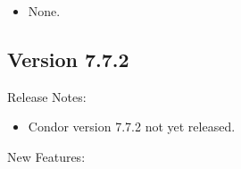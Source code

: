 \begin{itemize}

\item None.

\end{itemize}


\subsection*{\label{sec:New-7-7-2}Version 7.7.2}

\noindent Release Notes:

\begin{itemize}

\item Condor version 7.7.2 not yet released.

\end{itemize}


\noindent New Features:

